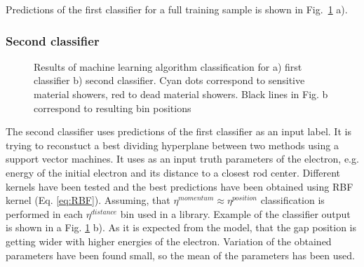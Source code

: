 {Predictions of the first classifier for a full training sample is shown in Fig.~\ref{fig:Class} a). 

\begin{figure}[!tbp]
\end{figure}

\subsubsection{Second classifier}

\begin{figure}[!tbp]
\begin{minipage}[h]{0.49\linewidth}
\end{minipage}
\hfill
\begin{minipage}[h]{0.49\linewidth}
\end{minipage}
\caption{Results of machine learning algorithm classification for a) first classifier b) second classifier. Cyan dots correspond to sensitive material showers, red to dead material showers. Black lines in Fig. b correspond to resulting bin positions}
\label{fig:Class}
\end{figure}

The second classifier uses predictions of the first classifier as an input label. It is trying to reconstuct a best dividing hyperplane between two methods using a support vector machines. It uses as an input truth parameters of the electron, e.g. energy of the initial electron and its distance to a closest rod center. Different kernels have been tested and the best predictions have been obtained using RBF kernel (Eq. \ref{eq:RBF}).  Assuming, that $\eta^{momentum} \approx \eta^{position}$ classification is performed in each $\eta^{distance}$ bin used in a library. Example of the classifier output is shown in a Fig. \ref{fig:Class} b). As it is expected from the model, that the gap position is getting wider with higher energies of the electron.  Variation of the obtained parameters have been found small, so the mean of the parameters has been used.  

}
